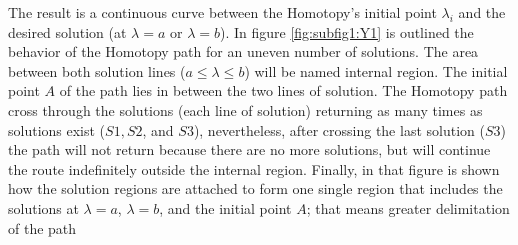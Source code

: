 \documentclass[conference,letterpaper,onecolumn]{IEEEtran}
\begin{document}
The result is a continuous curve between the Homotopy's initial point $\lambda_i$ and the desired solution (at $\lambda=a$ or $\lambda=b$). In figure \ref{fig:subfig1:Y1} is outlined the behavior of the Homotopy path for an uneven number of solutions. The area between both solution lines ($a \leq \lambda \leq b $) will be named internal region. The initial point $A$ of the path lies in between the two lines of solution. The Homotopy path cross through the solutions (each line of solution) returning as many times as solutions exist ($S1,S2$, and $S3$), nevertheless, after crossing the last solution ($S3$) the path will not return because there are no more solutions, but will continue the route indefinitely outside the internal region. Finally, in that figure is shown how the solution regions are attached to form one single region that includes the solutions at $\lambda=a$, $\lambda=b$, and the initial point $A$; that means greater delimitation of the path
\end{document}
